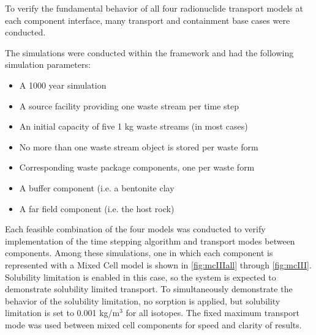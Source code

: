 
To verify the fundamental behavior of all four \Cyder radionuclide transport models at
each component interface, many transport and containment base cases were
conducted.

The simulations were conducted within the \Cyclus framework and had the
following simulation parameters:

\begin{itemize}
\item{A 1000 year simulation}
\item{A source facility providing one waste stream per time step}
\item{An initial capacity of five 1 kg waste streams (in most cases)}
\item{No more than one waste stream object is stored per waste form}
\item{Corresponding waste package components, one per waste form}
\item{A buffer component (i.e. a bentonite clay}
\item{A far field component (i.e. the host rock)}
\end{itemize}


Each feasible combination of the four models was conducted to verify
implementation of the time stepping algorithm and transport modes between
components. Among these simulations, one in which each component is represented with a Mixed
Cell model is shown in \ref{fig:mcIIIall} through \ref{fig:mcIII}.  Solubility
limitation is enabled in this case, so the system is expected to demonstrate
solubility limited transport.  To simultaneously demonstrate the behavior of
the solubility limitation, no sorption is applied, but solubility limitation is
set to 0.001 kg/m$^3$ for all isotopes.  The fixed maximum transport mode was
used between mixed cell components for speed and clarity of results.



\FloatBarrier

